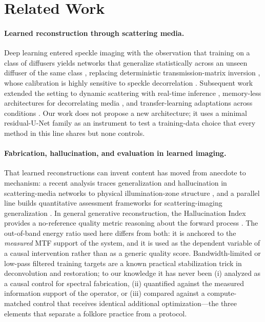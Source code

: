 \section{Related Work}
\label{sec:related}

\paragraph{Learned reconstruction through scattering media.}
Deep learning entered speckle imaging with the observation that training on a class of diffusers yields networks that generalize statistically across an unseen diffuser of the same class \cite{li2018deep}, replacing deterministic transmission-matrix inversion \cite{popoff2010image}, whose calibration is highly sensitive to speckle decorrelation \cite{li2018deep}. Subsequent work extended the setting to dynamic scattering with real-time inference \cite{liu2024learning}, memory-less architectures for decorrelating media \cite{zhang2024memoryless}, and transfer-learning adaptations across conditions \cite{li2025cascade}. Our work does not propose a new architecture; it uses a minimal residual-U-Net family as an instrument to test a training-data choice that every method in this line shares but none controls.

\paragraph{Fabrication, hallucination, and evaluation in learned imaging.}
That learned reconstructions can invent content has moved from anecdote to mechanism: a recent analysis traces generalization and hallucination in scattering-media networks to physical illumination-zone structure \cite{zhang2026physical}, and a parallel line builds quantitative assessment frameworks for scattering-imaging generalization \cite{long2026universal}. In general generative reconstruction, the Hallucination Index provides a no-reference quality metric reasoning about the forward process \cite{tivnan2024hallucination}. The out-of-band energy ratio used here differs from both: it is anchored to the \emph{measured} MTF support of the system, and it is used as the dependent variable of a causal intervention rather than as a generic quality score. Bandwidth-limited or low-pass filtered training targets are a known practical stabilization trick in deconvolution and restoration; to our knowledge it has never been (i) analyzed as a causal control for spectral fabrication, (ii) quantified against the measured information support of the operator, or (iii) compared against a compute-matched control that receives identical additional optimization---the three elements that separate a folklore practice from a protocol.

